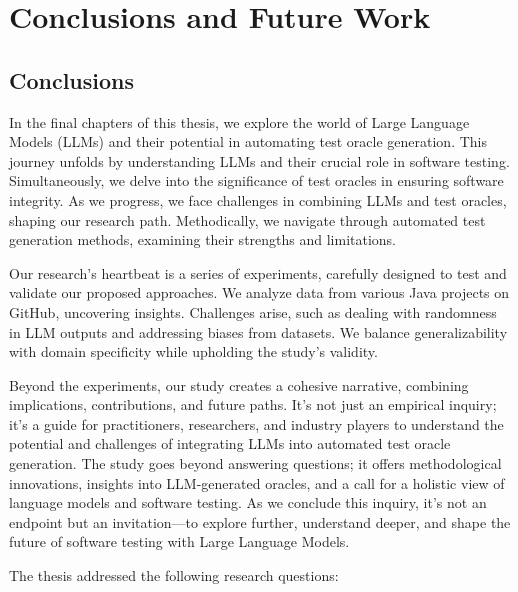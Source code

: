 \chapter{Conclusions and Future Work}
\label{cha:conclusions}
\vspace{0.4 cm}

\section{Conclusions}
\label{sec:conclusions}
\vspace{0.2 cm}

In the final chapters of this thesis, we explore the world of Large Language Models (LLMs) and their potential in automating test oracle generation. This journey unfolds by understanding LLMs and their crucial role in software testing. Simultaneously, we delve into the significance of test oracles in ensuring software integrity. As we progress, we face challenges in combining LLMs and test oracles, shaping our research path. Methodically, we navigate through automated test generation methods, examining their strengths and limitations.

Our research's heartbeat is a series of experiments, carefully designed to test and validate our proposed approaches. We analyze data from various Java projects on GitHub, uncovering insights. Challenges arise, such as dealing with randomness in LLM outputs and addressing biases from datasets. We balance generalizability with domain specificity while upholding the study's validity.

Beyond the experiments, our study creates a cohesive narrative, combining implications, contributions, and future paths. It's not just an empirical inquiry; it's a guide for practitioners, researchers, and industry players to understand the potential and challenges of integrating LLMs into automated test oracle generation. The study goes beyond answering questions; it offers methodological innovations, insights into LLM-generated oracles, and a call for a holistic view of language models and software testing. As we conclude this inquiry, it's not an endpoint but an invitation—to explore further, understand deeper, and shape the future of software testing with Large Language Models.

The thesis addressed the following research questions:

